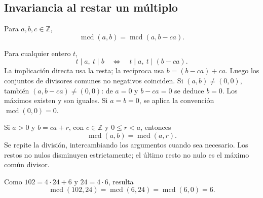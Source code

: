 \subsection{Invariancia al restar un múltiplo}
\begin{proposicion}
Para $a,b,c\in\mathbb Z$,
\[
\operatorname{mcd}(a,b)=\operatorname{mcd}(a,b-ca).
\]
\end{proposicion}
\begin{demostracion}
Para cualquier entero $t$,
\[
t\mid a,\ t\mid b\quad\Longleftrightarrow\quad t\mid a,\ t\mid(b-ca).
\]
La implicación directa usa la resta; la recíproca usa $b=(b-ca)+ca$. Luego los conjuntos de divisores comunes no negativos coinciden. Si $(a,b)\neq(0,0)$, también $(a,b-ca)\neq(0,0)$: de $a=0$ y $b-ca=0$ se deduce $b=0$. Los máximos existen y son iguales. Si $a=b=0$, se aplica la convención $\operatorname{mcd}(0,0)=0$.
\end{demostracion}
\begin{teoria}[{title={Algoritmo de Euclides}}]
Si $a>0$ y $b=ca+r$, con $c\in\mathbb Z$ y $0\leq r<a$, entonces
\[
\operatorname{mcd}(a,b)=\operatorname{mcd}(a,r).
\]
Se repite la división, intercambiando los argumentos cuando sea necesario. Los restos no nulos disminuyen estrictamente; el último resto no nulo es el máximo común divisor.
\end{teoria}
\begin{ejemplo}
Como $102=4\cdot24+6$ y $24=4\cdot6$, resulta
\[
\operatorname{mcd}(102,24)=\operatorname{mcd}(6,24)=\operatorname{mcd}(6,0)=6.
\]
\end{ejemplo}

